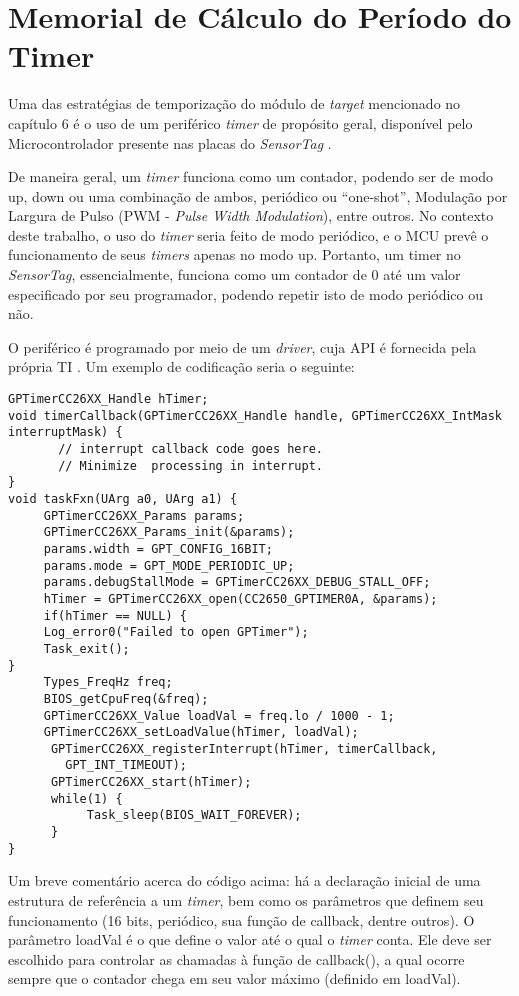 \chapter{Memorial de Cálculo do Período do Timer}

Uma das estratégias de temporização do módulo de \emph{target} mencionado no capítulo 6 é o uso de um periférico \emph{timer} de propósito geral, disponível pelo Microcontrolador presente nas placas do \emph{SensorTag} \cite{datasheet}.

De maneira geral, um \emph{timer} funciona como um contador, podendo ser de modo up, down ou uma combinação de ambos, periódico ou “one-shot”, Modulação por Largura de Pulso (PWM - \emph{Pulse Width Modulation}), entre outros. No contexto deste trabalho, o uso do \emph{timer} seria feito de modo periódico, e o MCU prevê o funcionamento de seus \emph{timers} apenas no modo up. Portanto, um timer no \emph{SensorTag}, essencialmente, funciona como um contador de 0 até um valor especificado por seu programador, podendo repetir isto de modo periódico ou não.

O periférico é programado por meio de um \emph{driver}, cuja API é fornecida pela própria TI \cite{shibata}. Um exemplo de codificação seria o seguinte:

\begin{lstlisting}
GPTimerCC26XX_Handle hTimer;
void timerCallback(GPTimerCC26XX_Handle handle, GPTimerCC26XX_IntMask interruptMask) {
       // interrupt callback code goes here.
       // Minimize  processing in interrupt.
}
void taskFxn(UArg a0, UArg a1) {
     GPTimerCC26XX_Params params;
     GPTimerCC26XX_Params_init(&params);
     params.width = GPT_CONFIG_16BIT;
     params.mode = GPT_MODE_PERIODIC_UP;
     params.debugStallMode = GPTimerCC26XX_DEBUG_STALL_OFF;
     hTimer = GPTimerCC26XX_open(CC2650_GPTIMER0A, &params);
     if(hTimer == NULL) {
     Log_error0("Failed to open GPTimer");
     Task_exit();
}
     Types_FreqHz freq;
     BIOS_getCpuFreq(&freq);
     GPTimerCC26XX_Value loadVal = freq.lo / 1000 - 1;
     GPTimerCC26XX_setLoadValue(hTimer, loadVal);
      GPTimerCC26XX_registerInterrupt(hTimer, timerCallback,
        GPT_INT_TIMEOUT);
      GPTimerCC26XX_start(hTimer);
      while(1) {
           Task_sleep(BIOS_WAIT_FOREVER);
      }
}
\end{lstlisting}

Um breve comentário acerca do código acima: há a declaração inicial de uma estrutura de referência a um \emph{timer}, bem como os parâmetros que definem seu funcionamento (16 bits, periódico, sua função de callback, dentre outros). O parâmetro loadVal é o que define o valor até o qual o \emph{timer} conta. Ele deve ser escolhido para controlar as chamadas à função de callback(), a qual ocorre sempre que o contador chega em seu valor máximo (definido em loadVal).

